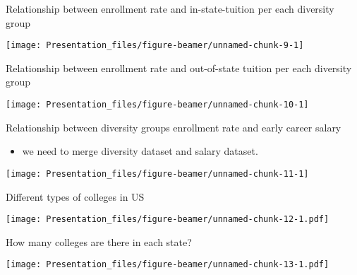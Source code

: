 \documentclass[
  ignorenonframetext,
]{beamer}
\providecommand{\tightlist}{%
  \setlength{\itemsep}{0pt}\setlength{\parskip}{0pt}}
\begin{document}
\begin{frame}{Relationship between enrollment rate and in-state-tuition
per each diversity group}
\protect\hypertarget{relationship-between-enrollment-rate-and-in-state-tuition-per-each-diversity-group}{}

\begin{center}\texttt{[image: Presentation\_files/figure-beamer/unnamed-chunk-9-1]} \end{center}

\end{frame}

\begin{frame}{Relationship between enrollment rate and out-of-state
tuition per each diversity group}
\protect\hypertarget{relationship-between-enrollment-rate-and-out-of-state-tuition-per-each-diversity-group}{}

\begin{center}\texttt{[image: Presentation\_files/figure-beamer/unnamed-chunk-10-1]} \end{center}

\end{frame}

\begin{frame}{Relationship between diversity groups enrollment rate and
early career salary}
\protect\hypertarget{relationship-between-diversity-groups-enrollment-rate-and-early-career-salary}{}

\begin{itemize}
\tightlist
\item
  we need to merge diversity dataset and salary dataset.
\end{itemize}

\begin{center}\texttt{[image: Presentation\_files/figure-beamer/unnamed-chunk-11-1]} \end{center}

\end{frame}

\begin{frame}{Different types of colleges in US}
\protect\hypertarget{different-types-of-colleges-in-us}{}

\texttt{[image: Presentation\_files/figure-beamer/unnamed-chunk-12-1.pdf]}

\end{frame}

\begin{frame}{How many colleges are there in each state?}
\protect\hypertarget{how-many-colleges-are-there-in-each-state}{}

\texttt{[image: Presentation\_files/figure-beamer/unnamed-chunk-13-1.pdf]}

\end{frame}
\end{document}
